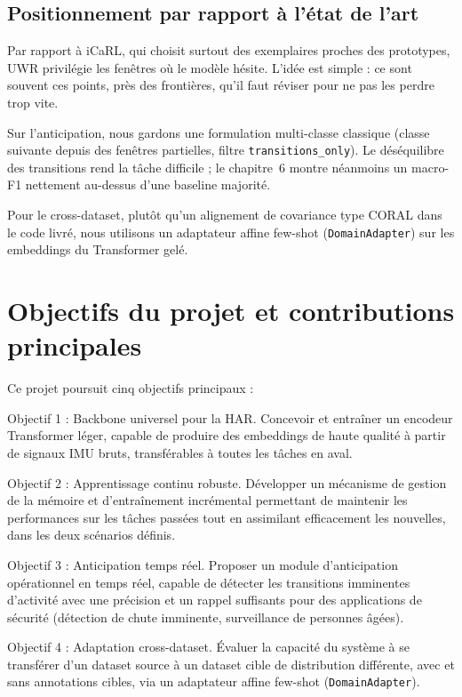 \documentclass[a4paper,12pt]{report}
\begin{document}
\subsection{Positionnement par rapport à l'état de l'art}

Par rapport à iCaRL, qui choisit surtout des exemplaires proches des
prototypes, UWR privilégie les fenêtres où le modèle hésite. L'idée est
simple : ce sont souvent ces points, près des frontières, qu'il faut
réviser pour ne pas les perdre trop vite.

Sur l'anticipation, nous gardons une formulation multi-classe classique
(classe suivante depuis des fenêtres partielles, filtre
\texttt{transitions\_only}). Le déséquilibre des transitions rend la tâche
difficile ; le chapitre~6 montre néanmoins un macro-F1 nettement au-dessus
d'une baseline majorité.

Pour le cross-dataset, plutôt qu'un alignement de covariance type CORAL
dans le code livré, nous utilisons un adaptateur affine few-shot
(\texttt{DomainAdapter}) sur les embeddings du Transformer gelé.

\section{Objectifs du projet et contributions principales}

Ce projet poursuit cinq objectifs principaux :

Objectif 1 : Backbone universel pour la HAR. Concevoir et entraîner un encodeur Transformer léger, capable de produire des embeddings de haute qualité à partir de signaux IMU bruts, transférables à toutes les tâches en aval.

Objectif 2 : Apprentissage continu robuste. Développer un mécanisme de gestion de la mémoire et d'entraînement incrémental permettant de maintenir les performances sur les tâches passées tout en assimilant efficacement les nouvelles, dans les deux scénarios définis.

Objectif 3 : Anticipation temps réel. Proposer un module d'anticipation opérationnel en temps réel, capable de détecter les transitions imminentes d'activité avec une précision et un rappel suffisants pour des applications de sécurité (détection de chute imminente, surveillance de personnes âgées).

Objectif 4 : Adaptation cross-dataset. Évaluer la capacité du système à se transférer d'un dataset source à un dataset cible de distribution différente, avec et sans annotations cibles, via un adaptateur affine few-shot (\texttt{DomainAdapter}).
\end{document}
